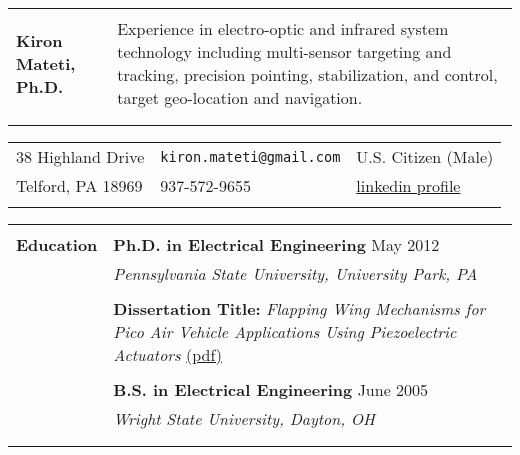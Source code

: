 \documentclass{article}[16pt]
\newlength{\lcolw}
\newlength{\rcolw}
\newlength{\hlcolw}
\begin{document}
\begin{tabular}{L{\lcolw} L{\rcolw}}
\hline \\
\textbf{\LARGE {Kiron Mateti, Ph.D.}} & {\large Experience in electro-optic and infrared system technology including multi-sensor targeting and tracking, precision pointing, stabilization, and control, target geo-location and navigation.} \\  \\
\hline \hline \\ 
\end{tabular}

\vspace{-0.1in}

\begin{tabular} {L{2in}  L{2.5in} L{2in}}
38 Highland Drive & {\tt  kiron.mateti@gmail.com} & U.S. Citizen (Male) \\
Telford, PA 18969 & 937-572-9655 & \href{http://www.linkedin.com/in/kiron-mateti-b691152}{linkedin profile}
\\ \\
\end{tabular}

\vspace{-0.1in}

\begin{tabular}{L{\hlcolw}  L{\rcolw}}
\hline \hline \\
\textbf{\Large Education} & \textbf{\large Ph.D. in Electrical Engineering} \hfill {\large May 2012} \\ 
& {\it\large Pennsylvania State University, University Park, PA} \\ \\
&  \textbf{Dissertation Title:} \textit{Flapping Wing Mechanisms for Pico Air Vehicle Applications Using Piezoelectric Actuators}
\href{http://www.mne.psu.edu/mrl/theses/mateti.pdf}{(pdf)} \\ \\
 & \textbf{\large B.S. in Electrical Engineering} \hfill {\large June 2005} \\ 
& {\it\large Wright State University, Dayton, OH} \\
 \\ \hline \\
\end{tabular}
\end{document}
